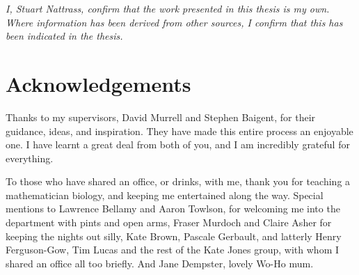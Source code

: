 \documentclass[a4paper]{report}
\begin{document}
\pagestyle{fancy}
\renewcommand{\chaptermark}[1]{%
\markboth{\MakeUppercase{%
\chaptername\ \thechapter.%
\ #1}}{}}
\fancyhead{}
\fancyhead[R]{\leftmark}




\newpage

\vspace*{\fill}

\begin{centering}

\textit{I, Stuart Nattrass, confirm that the work presented in this thesis is my own. Where information has been derived from other sources, I confirm that this has been indicated in the thesis.}

\end{centering}

\vspace*{\fill}


\newpage






\newpage


\doublespacing

\chapter*{Acknowledgements}

Thanks to my supervisors, David Murrell and Stephen Baigent, for their guidance, ideas, and inspiration. They have made this entire process an enjoyable one. I have learnt a great deal from both of you, and I am incredibly grateful for everything.

To those who have shared an office, or drinks, with me, thank you for teaching a mathematician biology, and keeping me entertained along the way. Special mentions to Lawrence Bellamy and Aaron Towlson, for welcoming me into the department with pints and open arms, Fraser Murdoch and Claire Asher for keeping the nights out silly, Kate Brown, Pascale Gerbault, and latterly Henry Ferguson-Gow, Tim Lucas and the rest of the Kate Jones group, with whom I shared an office all too briefly. And Jane Dempster, lovely Wo-Ho mum.
\end{document}
